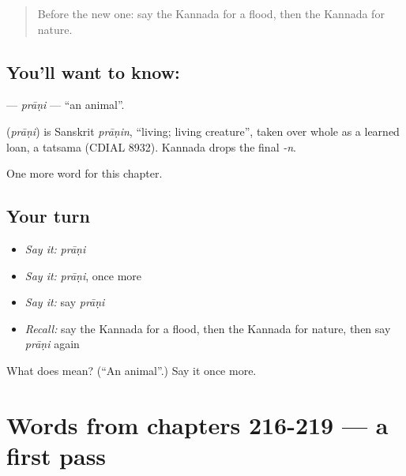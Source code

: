 \label{lesson:KA-C224-prani}



\begin{quote}
Before the new one: say the Kannada for a flood, then the Kannada for nature.
\end{quote}

\subsection*{You'll want to know: }
\textbf{} — \emph{prāṇi} — \textquotedblleft{}an animal\textquotedblright{}.

\begin{cousinweb}
\textbf{} (\emph{prāṇi}) is Sanskrit \emph{prāṇin}, \textquotedblleft{}living; living creature\textquotedblright{}, taken over whole as a learned loan, a tatsama (CDIAL 8932). Kannada drops the final \emph{-n}.
\end{cousinweb}

\begin{grammarlens}[title={What you've built}]
One more word for this chapter.
\end{grammarlens}

\subsection*{Your turn}
\begin{itemize}
\raggedright
  \item \emph{Say it:} \emph{prāṇi}
  \item \emph{Say it:} \emph{prāṇi}, once more
  \item \emph{Say it:} say \emph{prāṇi}
  \item \emph{Recall:} say the Kannada for a flood, then the Kannada for nature, then say \emph{prāṇi} again
\end{itemize}

\begin{tcolorbox}[breakable,colback=teal!4,colframe=teal!35!black,title={Before you move on}]
What does  mean? (\textquotedblleft{}An animal\textquotedblright{}.) Say it once more.
\end{tcolorbox}
\section[(dialogue)]{Words from chapters 216-219 — a first pass}

\label{lesson:KA-R224-first-pass-words-from-chapters-216-219}



